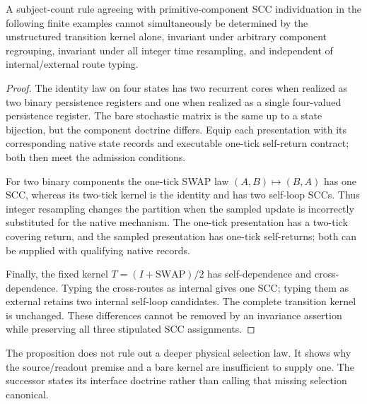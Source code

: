 \begin{proposition}
\label{prop:spc2-canonicality-obstruction}
A subject-count rule agreeing with primitive-component SCC individuation
in the following finite examples cannot simultaneously be determined by
the unstructured transition kernel alone, invariant under arbitrary
component regrouping, invariant under all integer time resampling, and
independent of internal/external route typing.
\end{proposition}
\begin{proof}
The identity law on four states has two recurrent cores when realized
as two binary persistence registers and one when realized as a single
four-valued persistence register. The bare stochastic matrix is the same
up to a state bijection, but the component doctrine differs. Equip each presentation with its corresponding native state records and executable one-tick self-return contract; both then meet the admission conditions.

For two binary components the one-tick SWAP law
$(A,B)\mapsto(B,A)$ has one SCC, whereas its two-tick kernel is the
identity and has two self-loop SCCs. Thus integer resampling changes the
partition when the sampled update is incorrectly substituted for the native mechanism. The one-tick presentation has a two-tick covering return, and the sampled presentation has one-tick self-returns; both can be supplied with qualifying native records.

Finally, the fixed kernel $T=(I+\mathrm{SWAP})/2$ has self-dependence and
cross-dependence. Typing the cross-routes as internal gives one SCC;
typing them as external retains two internal self-loop candidates. The
complete transition kernel is unchanged. These differences cannot be
removed by an invariance assertion while preserving all three stipulated
SCC assignments.
\end{proof}

The proposition does not rule out a deeper physical selection law. It
shows why the source/readout premise and a bare kernel are insufficient
to supply one. The successor states its interface doctrine rather than
calling that missing selection canonical.

